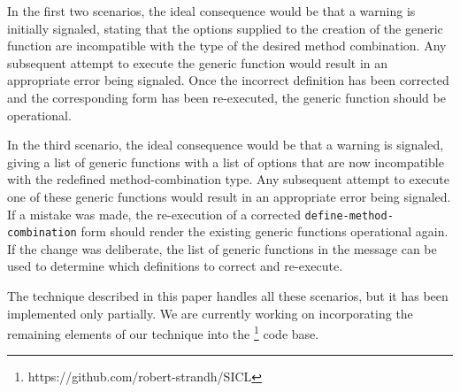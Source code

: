 In the first two scenarios, the ideal consequence would be that a
warning is initially signaled, stating that the options supplied to
the creation of the generic function are incompatible with the type of
the desired method combination.  Any subsequent attempt to execute the
generic function would result in an appropriate error being signaled.
Once the incorrect definition has been corrected and the corresponding
form has been re-executed, the generic function should be operational.

In the third scenario, the ideal consequence would be that a warning
is signaled, giving a list of generic functions with a list of options
that are now incompatible with the redefined method-combination type.
Any subsequent attempt to execute one of these generic functions would
result in an appropriate error being signaled.  If a mistake was made,
the re-execution of a corrected \texttt{define-method-combination}
form should render the existing generic functions operational again.
If the change was deliberate, the list of generic functions in the
message can be used to determine which definitions to correct and
re-execute.

The technique described in this paper handles all these scenarios, but
it has been implemented only partially.  We are currently working on
incorporating the remaining elements of our technique into the
\sicl{}%
\footnote{https://github.com/robert-strandh/SICL}
code base.
